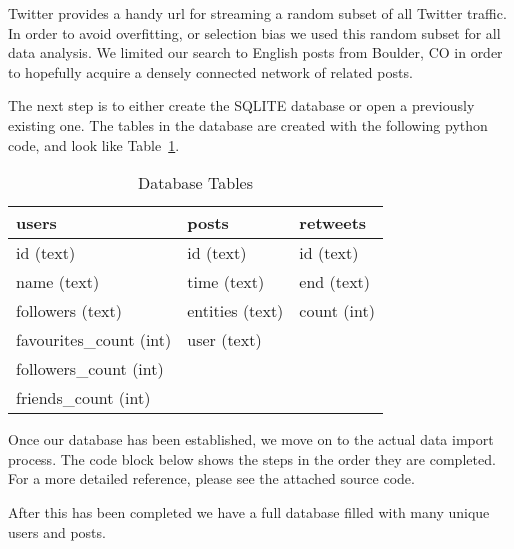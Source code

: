 
    Twitter provides a handy url for streaming a random subset of all Twitter traffic. In order to avoid overfitting, or selection bias we used this random subset for all data analysis. We limited our search to English posts from Boulder, CO in order to hopefully acquire a densely connected network of related posts.

    The next step is to either create the SQLITE database or open a previously existing one. The tables in the database are created with the following python code, and look like Table~\ref{table:database-tables}.


        \begin{table}[ht]
            \centering
            \begin{tabular}{| l | l | l |}
                \hline
                \textbf{users} & \textbf{posts} & \textbf{retweets}\\
                \hline
                id (text) & id (text) & id (text)\\
                \hline
                name (text) & time (text) & end (text)\\
                \hline
                followers (text) & entities (text) & count (int)\\
                \hline
                favourites\_count (int) & user (text) & \\
                \hline
                followers\_count (int) & & \\
                \hline
                friends\_count (int) & & \\
                \hline
            \end{tabular}
            \caption{Database Tables}
            \label{table:database-tables}
        \end{table}

    Once our database has been established, we move on to the actual data import process. The code block below shows the steps in the order they are completed. For a more detailed reference, please see the attached source code.


    After this has been completed we have a full database filled with many unique users and posts.

